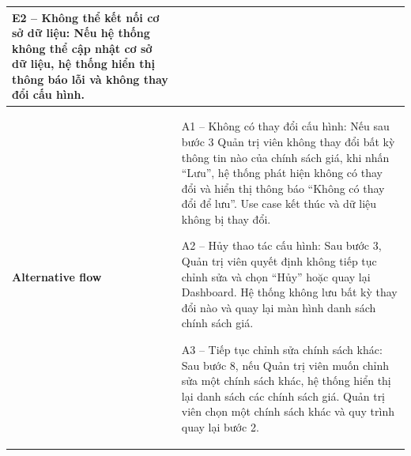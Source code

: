\begin{table}[H]
\begin{tabular}{|p{4cm}|p{10cm}|}
E2 – Không thể kết nối cơ sở dữ liệu:
Nếu hệ thống không thể cập nhật cơ sở dữ liệu, hệ thống hiển thị thông báo lỗi và không thay đổi cấu hình. \\ \hline
\textbf{Alternative flow} &
A1 – Không có thay đổi cấu hình: Nếu sau bước 3 Quản trị viên không thay đổi bất kỳ thông tin nào của chính sách giá, khi nhấn ``Lưu'', hệ thống phát hiện không có thay đổi và hiển thị thông báo ``Không có thay đổi để lưu''. Use case kết thúc và dữ liệu không bị thay đổi. 

 A2 – Hủy thao tác cấu hình: Sau bước 3, Quản trị viên quyết định không tiếp tục chỉnh sửa và chọn ``Hủy'' hoặc quay lại Dashboard. Hệ thống không lưu bất kỳ thay đổi nào và quay lại màn hình danh sách chính sách giá. 

A3 – Tiếp tục chỉnh sửa chính sách khác: Sau bước 8, nếu Quản trị viên muốn chỉnh sửa một chính sách khác, hệ thống hiển thị lại danh sách các chính sách giá. Quản trị viên chọn một chính sách khác và quy trình quay lại bước 2. \\
\hline
\end{tabular}
\end{table}